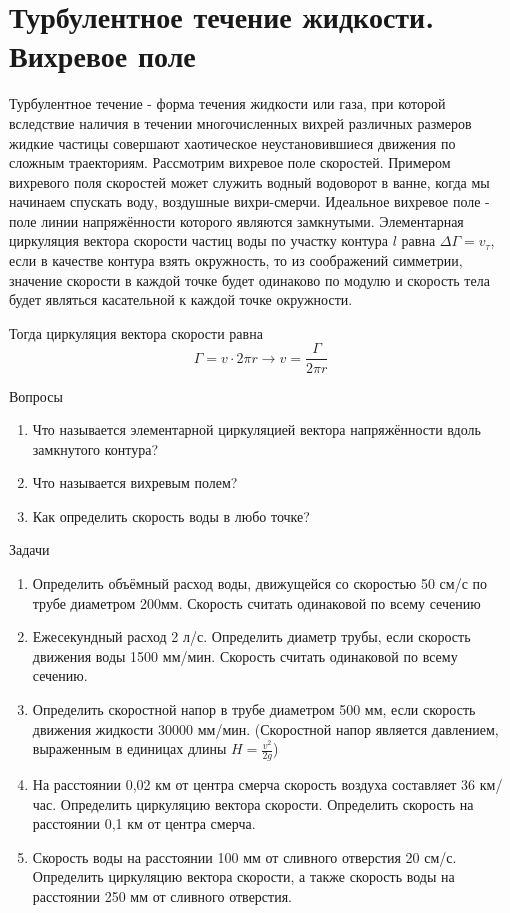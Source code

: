\documentclass[a6paper, 11pt]{diss_4}
\renewcommand{\'}{\,'}
\begin{document}
\section{Турбулентное течение жидкости. Вихревое поле}

  Турбулентное течение - форма течения жидкости или газа, при которой
вследствие наличия в течении многочисленных вихрей различных размеров жидкие
частицы совершают хаотическое неустановившиеся движения по сложным траекториям.
 Рассмотрим вихревое поле скоростей. Примером вихревого поля скоростей может
служить водный водоворот в ванне, когда мы начинаем спускать воду, воздушные
вихри-смерчи. Идеальное вихревое поле - поле линии напряжённости которого
являются замкнутыми. Элементарная циркуляция вектора скорости частиц воды по
участку контура $l$ равна $\Delta\Gamma=v_\tau$, если в качестве контура взять
окружность, то из соображений симметрии, значение скорости в каждой точке будет
одинаково по модулю и скорость тела будет являться касательной к каждой точке
окружности.

Тогда циркуляция вектора скорости равна
\[
\Gamma=v\cdot2\pi r\to
v=\frac{\Gamma}{2\pi r}
\]

\begin{center}
   Вопросы
\end{center}
\begin{enumerate}
\item Что называется элементарной циркуляцией вектора напряжённости
 вдоль замкнутого контура?
\item Что называется вихревым полем?
\item Как определить скорость воды в любо точке?
\end{enumerate}

\begin{center}
   Задачи
\end{center}
\begin{enumerate}
\item Определить объёмный расход воды, движущейся со скоростью 50 см/с по
 трубе диаметром 200мм. Скорость считать одинаковой по всему сечению

\item Ежесекундный расход 2 л/с. Определить диаметр трубы, если скорость
 движения воды 1500 мм/мин. Скорость считать одинаковой по всему сечению.

\item Определить скоростной напор в трубе диаметром 500 мм, если скорость
 движения жидкости 30000 мм/мин. (Скоростной напор является давлением,
 выраженным в единицах длины $H=\frac{v^2}{2g}$)

\item На расстоянии 0,02 км от центра смерча скорость воздуха
составляет 36 км/час. Определить циркуляцию вектора скорости.
Определить скорость на расстоянии 0,1 км от центра смерча.

\item Скорость воды на расстоянии 100 мм от сливного отверстия 20 см/с.
Определить циркуляцию вектора скорости, а также скорость воды на
расстоянии 250 мм от сливного отверстия.
\end{enumerate}
\end{document}
